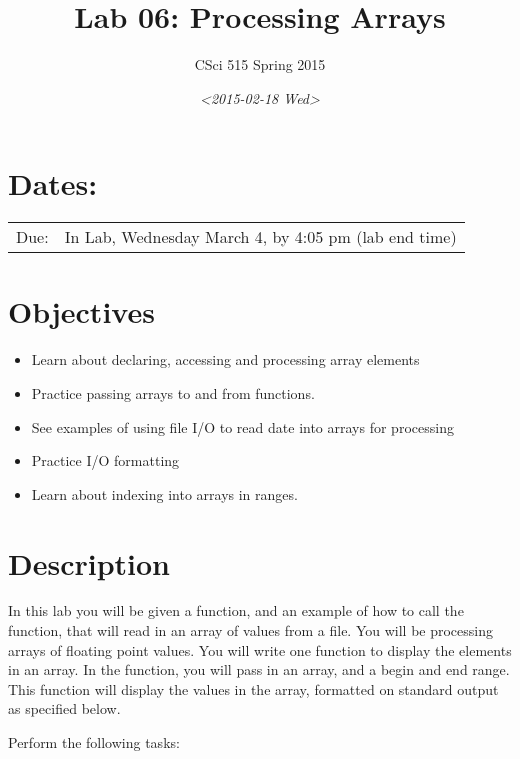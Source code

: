 \documentclass[11pt]{article}
\author{CSci 515 Spring 2015}
\date{\textit{<2015-02-18 Wed>}}
\title{Lab 06: Processing Arrays}
\begin{document}
\maketitle

\section*{Dates:}
\label{sec-1}
\begin{center}
\begin{tabular}{ll}
Due: & In Lab, Wednesday March 4, by 4:05 pm (lab end time)\\
\end{tabular}
\end{center}
\section*{Objectives}
\label{sec-2}
\begin{itemize}
\item Learn about declaring, accessing and processing array elements
\item Practice passing arrays to and from functions.
\item See examples of using file I/O to read date into arrays for processing
\item Practice I/O formatting
\item Learn about indexing into arrays in ranges.
\end{itemize}
\section*{Description}
\label{sec-3}
In this lab you will be given a function, and an example of how to
call the function, that will read in an array of values from a
file. You will be processing arrays of floating point values.  You
will write one function to display the elements in an array.  In the
function, you will pass in an array, and a begin and end range.  This
function will display the values in the array, formatted on standard
output as specified below.

Perform the following tasks:
\end{document}

